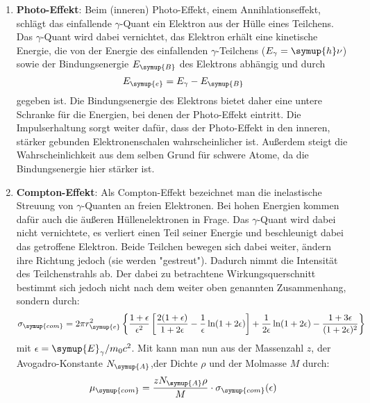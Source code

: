 \begin{enumerate}
  \item \textbf{Photo-Effekt}: Beim (inneren) Photo-Effekt, einem Annihlationseffekt,
  schlägt das einfallende $\gamma$-Quant ein Elektron aus der Hülle eines Teilchens.
  Das $\gamma$-Quant wird dabei vernichtet, das Elektron erhält eine kinetische
  Energie, die von der Energie des einfallenden $\gamma$-Teilchens ($E_\gamma = \symup{h}\nu$)
  sowie der Bindungsenergie $E_{\symup{B}}$ des Elektrons abhängig und durch
  \begin{equation}
    E_{\symup{e}} = E_\gamma - E_{\symup{B}}
    \label{eqn:2}
  \end{equation}
  gegeben ist. Die Bindungsenergie des Elektrons bietet daher eine untere Schranke
  für die Energien, bei denen der Photo-Effekt eintritt. Die Impulserhaltung sorgt
  weiter dafür, dass der Photo-Effekt in den inneren, stärker gebunden Elektronenschalen
  wahrscheinlicher ist. Außerdem steigt die Wahrscheinlichkeit aus dem selben Grund
  für schwere Atome, da die Bindungsenergie hier stärker ist.
  \item \textbf{Compton-Effekt}: Als Compton-Effekt bezeichnet man die inelastische Streuung
  von $\gamma$-Quanten an freien Elektronen. Bei hohen Energien kommen dafür auch die äußeren
  Hüllenelektronen in Frage. Das $\gamma$-Quant wird dabei nicht vernichtete, es verliert einen
  Teil seiner Energie und beschleunigt dabei das getroffene Elektron. Beide Teilchen bewegen
  sich dabei weiter, ändern ihre Richtung jedoch (sie werden "gestreut"). Dadurch nimmt
  die Intensität des Teilchenstrahls ab. Der dabei zu betrachtene Wirkungsquerschnitt bestimmt
  sich jedoch nicht nach dem weiter oben genannten Zusammenhang, sondern durch:
  \begin{equation}
    \sigma_{\symup{com}} = 2 \pi r_{\symup{e}}^2 \left\{ \frac{1+\epsilon}{\epsilon^2} \left[ \frac{2(1+\epsilon)}
    {1+2\epsilon} - \frac{1}{\epsilon} \ln(1+2\epsilon) \right] + \frac{1}{2\epsilon}
    \ln(1+2\epsilon) - \frac{1+3\epsilon}{(1+2\epsilon)^2} \right\}
    \label{eqn:5}
  \end{equation}
  mit $\epsilon = \symup{E}_\gamma / m_0c^2$. Mit %
  kann man nun aus der Massenzahl $z$, der Avogadro-Konstante $N_{\symup{A}}$,der Dichte $\rho$ und
  der Molmasse $M$ durch:
  \begin{equation}
    \mu_{\symup{com}} = \frac{z N_{\symup{A}} \rho}{M} \cdot \sigma_{\symup{com}}(\epsilon)
    \label{eqn:4}
  \end{equation}

\end{enumerate}
